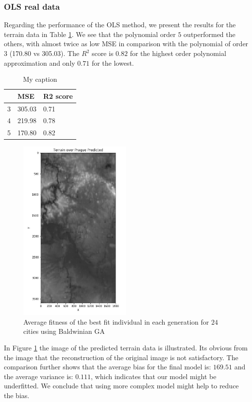 \documentclass [11pt]{article}
\begin{document}
\subsubsection{OLS real data}
Regarding the performance of the OLS method, we present the results for the terrain data in Table \ref{tab:olsTerrain}. We see that the polynomial order $5$ outperformed the others, with almost twice as low MSE in comparison with the polynomial of order $3$ (170.80 vs 305.03). The $R^{2}$ score is $0.82$ for the highest order polynomial approximation and only $0.71$ for the lowest. 
\begin{table}[H]
\centering
\begin{tabular}{lll}
\hline
  & MSE    & R2 score \\ \hline
3 & 305.03 & 0.71      \\
4 & 219.98 & 0.78     \\
5 & 170.80 & 0.82     \\ \hline
\end{tabular}%
\caption{My caption}
\label{tab:olsTerrain}
\end{table}

\begin{figure}[H]
\centering
\includegraphics[width=0.5\textwidth]{figures/TerrainPraguePred.png}
        \caption{Average fitness of the best fit individual in each generation for $24$ cities using Baldwinian GA}
        \label{fig:TerrainPraguePred}
\end{figure}
In Figure \ref{fig:TerrainPraguePred} the image of the predicted terrain data is illustrated. Its obvious from the image that the reconstruction of the original image is not satisfactory. The comparison further shows that the average bias for the final model is: $169.51$ and the average variance is: $0.111$, which indicates that our model might be underfitted. We conclude that using more complex model might help to reduce the bias.
\end{document}
